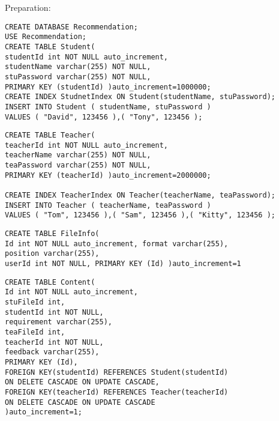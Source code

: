 \documentclass[draftclsnofoot, onecolumn, letterpaper, 10pt]{IEEEtran}
\begin{document}
Preparation:
\begin{lstlisting}[caption={Login as student and upload files database},captionpos=b]
CREATE DATABASE Recommendation; 
USE Recommendation;
CREATE TABLE Student(
studentId int NOT NULL auto_increment, 
studentName varchar(255) NOT NULL, 
stuPassword varchar(255) NOT NULL, 
PRIMARY KEY (studentId) )auto_increment=1000000;
CREATE INDEX StudnetIndex ON Student(studentName, stuPassword);
INSERT INTO Student ( studentName, stuPassword )
VALUES ( "David", 123456 ),( "Tony", 123456 );

\end{lstlisting} 
\begin{lstlisting}[caption={Login as teacher and upload files database},captionpos=b]
CREATE TABLE Teacher(
teacherId int NOT NULL auto_increment,
teacherName varchar(255) NOT NULL,
teaPassword varchar(255) NOT NULL,
PRIMARY KEY (teacherId) )auto_increment=2000000;

CREATE INDEX TeacherIndex ON Teacher(teacherName, teaPassword);
INSERT INTO Teacher ( teacherName, teaPassword ) 
VALUES ( "Tom", 123456 ),( "Sam", 123456 ),( "Kitty", 123456 );
\end{lstlisting}

\begin{lstlisting}[caption={file information},captionpos=b]
CREATE TABLE FileInfo(
Id int NOT NULL auto_increment, format varchar(255),
position varchar(255),
userId int NOT NULL, PRIMARY KEY (Id) )auto_increment=1
\end{lstlisting}

\begin{lstlisting}[caption={conncetion},captionpos=b]
CREATE TABLE Content(
Id int NOT NULL auto_increment, 
stuFileId int,
studentId int NOT NULL,
requirement varchar(255),
teaFileId int,
teacherId int NOT NULL,
feedback varchar(255),
PRIMARY KEY (Id),
FOREIGN KEY(studentId) REFERENCES Student(studentId) 
ON DELETE CASCADE ON UPDATE CASCADE,
FOREIGN KEY(teacherId) REFERENCES Teacher(teacherId) 
ON DELETE CASCADE ON UPDATE CASCADE
)auto_increment=1;
\end{lstlisting}
\end{document}
